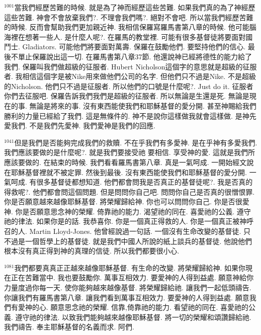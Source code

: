 \documentclass{book}
\begin{document}
$^{1001}$當我們經歷苦難的時候.
就是為了神而經歷這些苦難.
如果我們真的為了神經歷這些苦難.
神會不會放棄我們?.
不理會我們嗎?.
絕對不會吧.
所以當我們經歷苦難的時候.
反而會幫助我們更加親近神.
我相信保羅寫羅馬書第八章的時候.
他可能腦海裡在想著一些人.
是什麼人呢?.
在羅馬的教堂裡.
可能有很多基督徒將要面對國鬥士.
Gladiators.
可能他們將要面對萬壽.
保羅在鼓勵他們.
要堅持他們的信心.
最後不單止保羅說出這一切.
在羅馬書第八章37節.
他還說神已經將德性的能力給了我們.
保羅叫我們做超級的征服者.
Hubert Nicholson這個字的意思就是超級的征服者.
我相信這個字是被Nike用來做他們公司的名字.
但他們只不過是Nike.
不是超級的Nicholson.
他們只不過是征服者.
所以他們的口號是什麼呢?.
Just do it.
征服者你們去征服吧.
保羅告訴我們我們是超級的征服者.
所以無論是生還是死.
無論是現在的事.
無論是將來的事.
沒有東西能使我們和耶穌基督的愛分開.
甚至神賜給我們勝利的力量已經給了我們.
這是無條件的.
神不是說你這樣做我就會這樣做.
是神先愛我們.
不是我們先愛神.
我們愛神是我們的回應.

$^{1041}$但是我們是否能夠完成我們的救贖.
不在乎我們有多愛神.
是在乎神有多愛我們.
我們應該要做的是什麼呢?.
就是我們要接受祂 要相信.
享受神的愛.
這就是我們所應該要做的.
在結束的時候.
我們看看羅馬書第八章.
真是一氣呵成.
一開始經文說在耶穌基督裡就不被定罪.
然後到最後.
沒有東西能使我們和耶穌基督的愛分開.
一氣呵成.
有很多基督徒都想知道.
他們都會問我是否真正的基督徒呢?.
我是否真的得救呢?.
他們都會問這個問題.
但是問問你自己吧.
問問你自己是否真的很憎恨罪.
你是否願意越來越像耶穌基督.
將榮耀歸給神.
你也可以問問你自己.
你是否很愛神.
你是否願意思念神的榮耀.
倚靠祂的能力.
渴望祂的同在.
喜愛祂的公義.
遵守祂的律法.
如果你是的話.
我恭喜你.
你是一個真正得救的人.
你是一個真正被神呼召的人.
Martin Lloyd-Jones.
他曾經說過一句話.
一個沒有生命改變的基督徒.
只不過是一個哲學上的基督徒.
就是我們中國人所說的紙上談兵的基督徒.
他說他們根本沒有真正得到神的真理的信徒.
所以我們都要很小心.

$^{1081}$我們都要真真正正越來越像耶穌基督.
有生命的改變.
將榮耀歸給神.
如果你現在正在苦難當中.
我也要鼓勵你.
萬事互相效力.
要愛神的人得到益處.
願意神給你力量度過你每一天.
使你能夠越來越像基督.
將榮耀歸給祂.
讓我們一起低頭禱告.
你讓我們有羅馬書第八章.
讓我們看到萬事互相效力.
要愛神的人得到益處.
願意我們有愛神的心.
願意思念祂的榮耀.
信靠,倚靠祂的能力.
看望祂的同在.
喜愛祂的公義.
遵守祂的律法.
以致我們能夠越來越像耶穌基督.
將一切的榮耀和頌讚歸給祂.
我們禱告.
奉主耶穌基督的名義而求.
阿們.
\newpage
\end{document}
